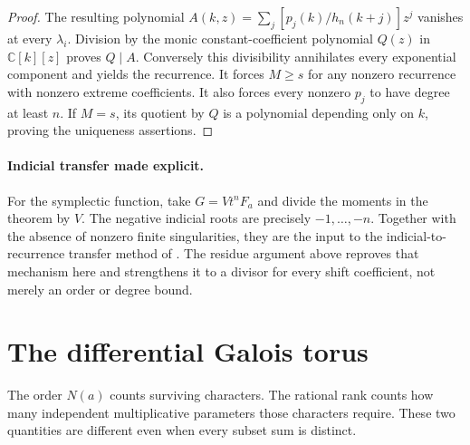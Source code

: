 \documentclass[11pt]{article}
\theoremstyle{definition}
\theoremstyle{remark}
\numberwithin{equation}{section}
\begin{document}
\begin{proof}
The resulting polynomial
$A(k,z)=\sum_j[p_j(k)/h_n(k+j)]z^j$ vanishes at every $\lambda_i$.
Division by the monic constant-coefficient polynomial $Q(z)$ in
$\mathbb C[k][z]$ proves $Q\mid A$. Conversely this divisibility
annihilates every exponential component and yields the recurrence.
It forces $M\ge s$ for any nonzero recurrence with nonzero extreme
coefficients. It also forces every nonzero $p_j$ to have degree at
least $n$. If $M=s$, its quotient by $Q$ is a polynomial depending
only on $k$, proving the uniqueness assertions.
\end{proof}


\paragraph{Indicial transfer made explicit.}
For the symplectic function, take $G=Vt^nF_a$ and divide the moments
in the theorem by $V$. The negative indicial roots are precisely
$-1,\ldots,-n$. Together with the absence of nonzero finite
singularities, they are the input to the indicial-to-recurrence
transfer method of \cite[Section 2]{KeioVertex}. The residue argument
above reproves that mechanism here and strengthens it to a divisor
for every shift coefficient, not merely an order or degree bound.


\section{The differential Galois torus}
\label{sec:galois}
The order $N(a)$ counts surviving characters. The rational rank counts
how many independent multiplicative parameters those characters require.
These two quantities are different even when every subset sum is distinct.
\end{document}
